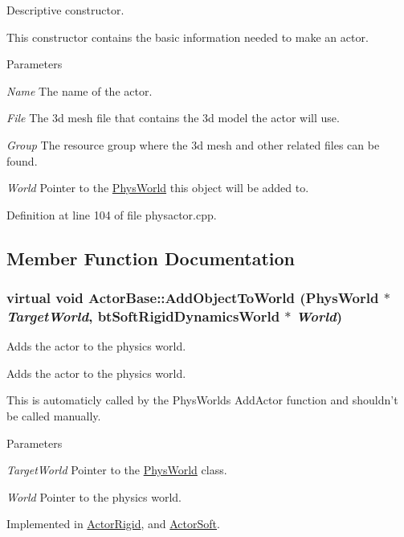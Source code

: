 Descriptive constructor. 

This constructor contains the basic information needed to make an actor. 
\begin{DoxyParams}{Parameters}
\item[{\em Name}]The name of the actor. \item[{\em File}]The 3d mesh file that contains the 3d model the actor will use. \item[{\em Group}]The resource group where the 3d mesh and other related files can be found. \item[{\em World}]Pointer to the \hyperlink{classPhysWorld}{PhysWorld} this object will be added to. \end{DoxyParams}


Definition at line 104 of file physactor.cpp.



\subsection{Member Function Documentation}
\hypertarget{classActorBase_a1af82a2ed960fd114518fdf84d5ff146}{
\subsubsection[{AddObjectToWorld}]{\setlength{\rightskip}{0pt plus 5cm}virtual void ActorBase::AddObjectToWorld ({\bf PhysWorld} $\ast$ {\em TargetWorld}, \/  btSoftRigidDynamicsWorld $\ast$ {\em World})}}
\label{dd/d7b/classActorBase_a1af82a2ed960fd114518fdf84d5ff146}


Adds the actor to the physics world. 

Adds the actor to the physics world. \par
 This is automaticly called by the PhysWorlds AddActor function and shouldn't be called manually. 
\begin{DoxyParams}{Parameters}
\item[{\em TargetWorld}]Pointer to the \hyperlink{classPhysWorld}{PhysWorld} class. \item[{\em World}]Pointer to the physics world. \end{DoxyParams}


Implemented in \hyperlink{classActorRigid_ac6d7e05944623329f0c2140c19e2c49e}{ActorRigid}, and \hyperlink{classActorSoft_a0def29f28ed4d126a0634ddc97e33e2f}{ActorSoft}.

